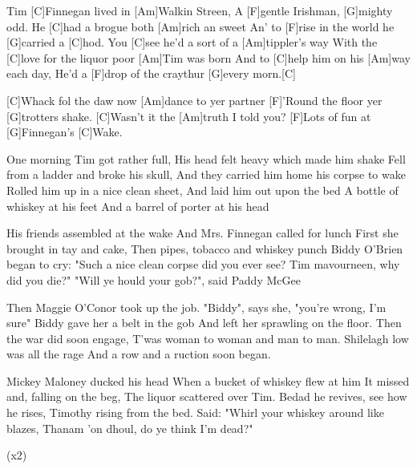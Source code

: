 

\begin{guitar}
	Tim [C]Finnegan lived in [Am]Walkin Streen,
	A [F]gentle Irishman, [G]mighty odd.
	He [C]had a brogue both [Am]rich an sweet
	An' to [F]rise in the world he [G]carried a [C]hod.
	You [C]see he'd a sort of a [Am]tippler's way 
	With the [C]love for the liquor poor [Am]Tim was born
	And to [C]help him on his [Am]way each day, 
	He'd a [F]drop of the craythur [G]every morn.[C]{}
	
	[C]Whack fol the daw now [Am]dance to yer partner
	[F]'Round the floor yer [G]trotters shake.
	[C]Wasn't it the [Am]truth I told you?
	[F]Lots of fun at [G]Finnegan's [C]Wake.
	
	One morning Tim got rather full,
	His head felt heavy which made him shake
	Fell from a ladder and broke his skull,
	And they carried him home his corpse to wake
	Rolled him up in a nice clean sheet, 
	And laid him out upon the bed
	A bottle of whiskey at his feet 
	And a barrel of porter at his head
	
	 
	
	\pagebreak
	
	His friends assembled at the wake 
	And Mrs. Finnegan called for lunch
	First she brought in tay and cake, 
	Then pipes, tobacco and whiskey punch
	Biddy O'Brien began to cry: 
	"Such a nice clean corpse did you ever see?
	Tim mavourneen, why did you die?" 
	"Will ye hould your gob?", said Paddy McGee
	
	 
	
	Then Maggie O'Conor took up the job. 
	"Biddy", says she, "you're wrong, I'm sure"
	Biddy gave her a belt in the gob 
	And left her sprawling on the floor.
	Then the war did soon engage, 
	T'was woman to woman and man to man.
	Shilelagh low was all the rage 
	And a row and a ruction soon began.
	
	 
	
	Mickey Maloney ducked his head 
	When a bucket of whiskey flew at him
	It missed and, falling on the beg,
	The liquor scattered over Tim.
	Bedad he revives, see how he rises,
	Timothy rising from the bed.
	Said: "Whirl your whiskey around like blazes, 
	Thanam 'on dhoul, do ye think I'm dead?"
	
	  (x2)
\end{guitar}
